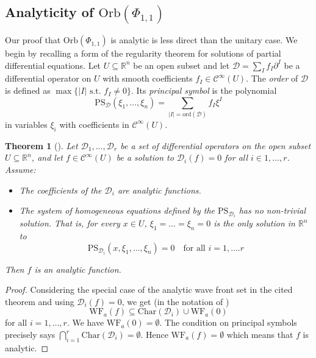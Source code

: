 \documentclass[reqno, 11pt]{amsart} %
\numberwithin{equation}{section}
\theoremstyle{plain}
\newtheorem{theorem}{Theorem}[section]
\theoremstyle{definition}
\theoremstyle{remark}
\newcommand{\mr}{\mathrm}
\newcommand{\mbR}{\mathbb{R}}
\newcommand{\mcC}{\mathcal{C}}
\newcommand{\mcD}{\mathcal{D}}
\newcommand{\Orb}{\mathrm{Orb}}
\begin{document}
\subsection{Analyticity of $\Orb(\Phi_{1,1})$}
 Our proof that $\Orb(\Phi_{1,1})$ is analytic is less direct than the unitary case. We begin by recalling a form of the regularity theorem for solutions of partial differential equations. Let $U\subseteq \mbR^n$ be an open subset and let $\mcD = \sum_{I} f_I \partial^I$ be a differential operator on $U$ with smooth coefficients $f_I\in \mcC^\infty(U)$. The \emph{order} of $\mcD$ is defined as $\max\{|I| \text{ s.t. } f_I\neq 0\}$. Its \emph{principal symbol} is the polynomial
$$\mr{PS}_\mcD(ξ_1,\ldots,ξ_n) = \sum_{|I| = \mr{ord}(\mcD)} f_I ξ^I$$
in variables $ξ_i$ with coefficients in $\mcC^\infty(U)$.
\begin{theorem}[]\label{thm:reg_thm_diff_eqn}
Let $\mcD_1,\ldots,\mcD_r$ be a set of differential operators on the open subset $U\subseteq \mbR^n$, and let $f \in \mcC^\infty(U)$ be a solution to $\mcD_i(f) = 0$ for all $i\in 1,\ldots,r$. Assume:
\begin{itemize}
\item The coefficients of the $\mcD_i$ are analytic functions.
\item The system of homogeneous equations defined by the $\mr{PS}_{\mcD_i}$ has no non-trivial solution. That is, for every $x\in U$, $ξ_1 = \ldots = ξ_n = 0$ is the only solution in $\mbR^n$ to
$$\mr{PS}_{\mcD_i}(x, ξ_1,\ldots,ξ_n) = 0\quad \text{for all }i = 1,\ldots.r$$
\end{itemize}
Then $f$ is an analytic function.
\end{theorem}
\begin{proof}
Considering the special case of the analytic wave front set in the cited theorem and using $\mcD_i(f) = 0$, we get (in the notation of \cite[\S8.6]{Hoermander})
$$\mr{WF}_a(f) \subseteq \mr{Char}(\mcD_i)\cup \mr{WF}_a(0)$$
for all $i = 1,\ldots,r$. We have $\mr{WF}_a(0) = \emptyset$. The condition on principal symbols precisely says $\bigcap_{i = 1}^r \mr{Char}(\mcD_i) = \emptyset$. Hence $\mr{WF}_a(f) = \emptyset$ which means that $f$ is analytic.
\end{proof}
\end{document}
